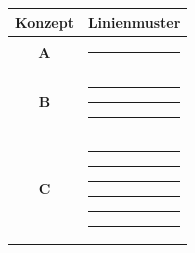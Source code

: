 \begin{center}
\small
\renewcommand{\arraystretch}{1.4}
\setlength{\tabcolsep}{12pt}
\begin{tabular}{|c|c|}
    \hline
    \textbf{Konzept} & \textbf{Linienmuster} \\
    \hline
    \textbf{A} &
    \textcolor{conceptA}{\rule{2.5cm}{0.8pt}} \\
    \hline
    \textbf{B} &
    \textcolor{conceptB}{
        \rule[0.3ex]{0.5cm}{0.8pt}\hspace{0.2cm}
        \rule[0.3ex]{0.5cm}{0.8pt}\hspace{0.2cm}
        \rule[0.3ex]{0.5cm}{0.8pt}
    } \\
    \hline
    \textbf{C} &
    \textcolor{conceptC}{
        \rule[0.3ex]{0.15cm}{0.8pt}\hspace{0.15cm}
        \rule[0.3ex]{0.15cm}{0.8pt}\hspace{0.15cm}
        \rule[0.3ex]{0.15cm}{0.8pt}\hspace{0.15cm}
        \rule[0.3ex]{0.15cm}{0.8pt}\hspace{0.15cm}
        \rule[0.3ex]{0.15cm}{0.8pt}\hspace{0.15cm}
        \rule[0.3ex]{0.15cm}{0.8pt}
    } \\
    \hline
\end{tabular}
\end{center}
\clearpage

